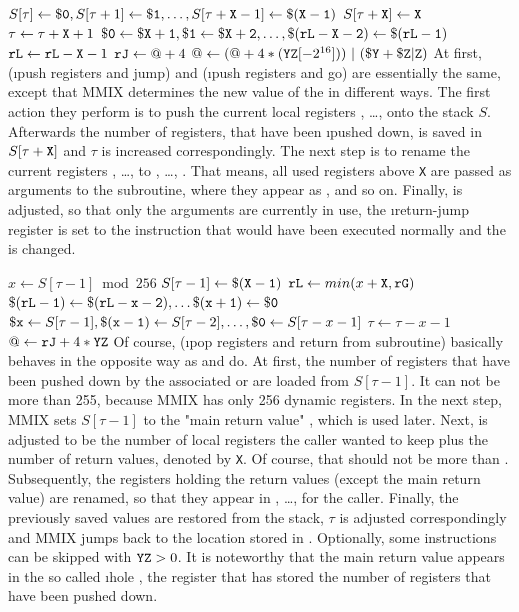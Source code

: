 \instrtblseven
	{}
	{$S[\tau] \leftarrow {\tt \$0}, S[\tau+1] \leftarrow {\tt \$1}, \dots, S[\tau + {\tt X} - 1] \leftarrow {\tt \$(X - 1)}$}
	{$S[\tau + {\tt X}] \leftarrow {\tt X}$}
	{$\tau \leftarrow \tau + {\tt X} + 1$}
	{${\tt \$0} \leftarrow {\tt \$X + 1}, {\tt \$1} \leftarrow {\tt \$X + 2},\dots, {\tt \$({\tt rL} - X - 2)} \leftarrow {\tt \$({\tt rL} - 1)}$}
	{${\tt rL} \leftarrow {\tt rL} - {\tt X} - 1$}
	{${\tt rJ} \leftarrow @ + 4$}
	{$@ \leftarrow (@+4*({\tt YZ}[-2^{16}]))~|~({\tt \$Y} + {\tt \$Z}{\tt|Z})$}
\noindent At first,  (\i{push registers and jump}) and  (\i{push registers and go}) are essentially the same, except that MMIX determines the new value of the  in different ways. The first action they perform is to push the current local registers , \dots,  onto the stack $S$. Afterwards the number of registers, that have been \i{pushed down}, is saved in $S[\tau + {\tt X}]$ and $\tau$ is increased correspondingly. The next step is to rename the current registers , \dots,  to , \dots, . That means, all used registers above {\tt X} are passed as arguments to the subroutine, where they appear as ,  and so on. Finally,  is adjusted, so that only the arguments are currently in use, the \i{return-jump register}  is set to the instruction that would have been executed normally and the  is changed. \citep[pg. 22]{mmix-doc}

\instrtblseven
	{}
	{$x \leftarrow S[\tau - 1] \bmod 256$}
	{$S[\tau - 1] \leftarrow {\tt \$(X - 1)}$}
	{${\tt rL} \leftarrow min(x + {\tt X},{\tt rG})$}
	{${\tt \$({\tt rL} - 1)} \leftarrow {\tt \$({\tt rL} - x - 2)}, \dots {\tt \$(x + 1)} \leftarrow {\tt \$0}$}
	{${\tt \$x} \leftarrow S[\tau - 1], {\tt \$(x - 1)} \leftarrow S[\tau - 2], \dots, {\tt \$0} \leftarrow S[\tau - x - 1]$}
	{$\tau \leftarrow \tau - x - 1$}
	{$@ \leftarrow {\tt rJ} + 4*{\tt YZ}$}
\noindent Of course,  (\i{pop registers and return from subroutine}) basically behaves in the opposite way as  and  do. At first, the number of registers that have been pushed down by the associated  or  are loaded from $S[\tau - 1]$. It can not be more than 255, because MMIX has only 256 dynamic registers. In the next step, MMIX sets $S[\tau - 1]$ to the "main return value" , which is used later. Next,  is adjusted to be the number of local registers the caller wanted to keep plus the number of return values, denoted by {\tt X}. Of course, that should not be more than . Subsequently, the registers holding the return values (except the main return value) are renamed, so that they appear in , \dots,  for the caller. Finally, the previously saved values are restored from the stack, $\tau$ is adjusted correspondingly and MMIX jumps back to the location stored in . Optionally, some instructions can be skipped with ${\tt YZ} > 0$. It is noteworthy that the main return value appears in the so called \i{hole} , \ie the register that has stored the number of registers that have been pushed down. \citep[pg. 22,23]{mmix-doc}

